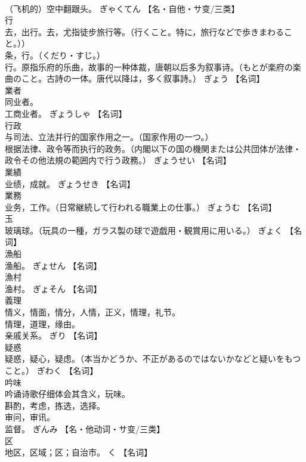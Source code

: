 \documentclass[8pt]{extreport}
\begin{document}
\begin{CJK}{UTF8}{min}
\\	（飞机的）空中翻跟头。	ぎゃくてん		【名・自他・サ变/三类】
\\	行	
\\	去，出行。去，尤指徒步旅行等。（行くこと。特に，旅行などで歩きまわること。）） 
\\	条，行。（くだり・すじ。） 
\\	行。原指乐府的乐曲，故事的一种体裁，唐朝以后多为叙事诗。（もとが楽府の楽曲のこと。古詩の一体。唐代以降は，多く叙事詩。）	ぎょう		【名词】
\\	業者	
\\	同业者。 
\\	工商业者。	ぎょうしゃ		【名词】
\\	行政	
\\	与司法、立法并行的国家作用之一。（国家作用の一つ。） 
\\	根据法律、政令等而执行的政务。（内閣以下の国の機関または公共団体が法律・政令その他法規の範囲内で行う政務。）	ぎょうせい		【名词】
\\	業績	
\\	业绩，成就。	ぎょうせき		【名词】
\\	業務	
\\	业务，工作。（日常継続して行われる職業上の仕事。）	ぎょうむ		【名词】
\\	玉	
\\	玻璃球。（玩具の一種，ガラス製の球で遊戯用・観賞用に用いる。）	ぎょく		【名词】
\\	漁船	
\\	渔船。	ぎょせん		【名词】
\\	漁村	
\\	渔村。	ぎょそん		【名词】
\\	義理	
\\	情义，情面，情分，人情，正义，情理，礼节。 
\\	情理，道理，缘由。 
\\	亲戚关系。	ぎり		【名词】
\\	疑惑	
\\	疑惑，疑心，疑虑。（本当かどうか、不正があるのではないかなどと疑いをもつこと。）	ぎわく		【名词】
\\	吟味	
\\	吟诵诗歌仔细体会其含义，玩味。 
\\	斟酌，考虑，拣选，选择。 
\\	审问，审讯。 
\\	监督。	ぎんみ		【名・他动词・サ变/三类】
\\	区	
\\	地区，区域；区；自治市。	く		【名词】

\end{CJK}
\end{document}
